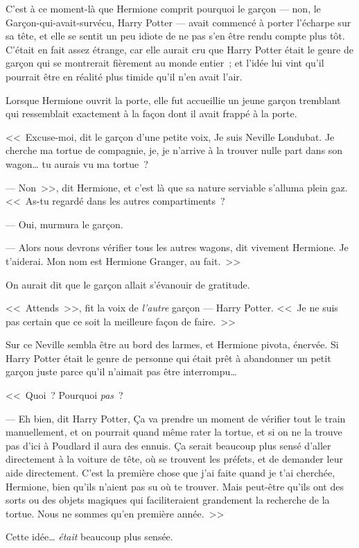 C'est à ce moment-là que Hermione comprit pourquoi le garçon — non, le Garçon-qui-avait-survécu, Harry Potter — avait commencé à porter l'écharpe sur sa tête, et elle se sentit un peu idiote de ne pas s'en être rendu compte plus tôt. C'était en fait assez étrange, car elle aurait cru que Harry Potter était le genre de garçon qui se montrerait fièrement au monde entier~; et l'idée lui vint qu'il pourrait être en réalité plus timide qu'il n'en avait l'air.

Lorsque Hermione ouvrit la porte, elle fut accueillie un jeune garçon tremblant qui ressemblait exactement à la façon dont il avait frappé à la porte.

<<~Excuse-moi, dit le garçon d'une petite voix, Je suis Neville Londubat. Je cherche ma tortue de compagnie, je, je n'arrive à la trouver nulle part dans son wagon… tu aurais vu ma tortue~?

--- Non~>>, dit Hermione, et c'est là que sa nature serviable s'alluma plein gaz. <<~As-tu regardé dans les autres compartiments~?

--- Oui, murmura le garçon.

--- Alors nous devrons vérifier tous les autres wagons, dit vivement Hermione. Je t'aiderai. Mon nom est Hermione Granger, au fait.~>>

On aurait dit que le garçon allait s'évanouir de gratitude.

<<~Attends~>>, fit la voix de \emph{l'autre} garçon — Harry Potter. <<~Je ne suis pas certain que ce soit la meilleure façon de faire.~>>

Sur ce Neville sembla être au bord des larmes, et Hermione pivota, énervée. Si Harry Potter était le genre de personne qui était prêt à abandonner un petit garçon juste parce qu'il n'aimait pas être interrompu…

<<~Quoi~? Pourquoi \emph{pas}~?

--- Eh bien, dit Harry Potter, Ça va prendre un moment de vérifier tout le train manuellement, et on pourrait quand même rater la tortue, et si on ne la trouve pas d'ici à Poudlard il aura des ennuis. Ça serait beaucoup plus sensé d'aller directement à la voiture de tête, où se trouvent les préfets, et de demander leur aide directement. C'est la première chose que j'ai faite quand je t'ai cherchée, Hermione, bien qu'ils n'aient pas su où te trouver. Mais peut-être qu'ils ont des sorts ou des objets magiques qui faciliteraient grandement la recherche de la tortue. Nous ne sommes qu'en première année.~>>

Cette idée… \emph{était} beaucoup plus sensée.


